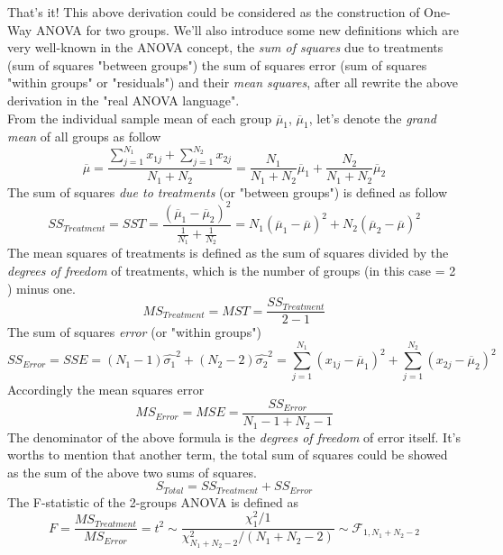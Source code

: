 That's it! This above derivation could be considered as the construction of One-Way ANOVA for two groups. We'll also introduce some new definitions which are very well-known in the ANOVA concept, the {\it sum of squares} due to treatments (sum of squares "between groups") the sum of squares error (sum of squares "within groups" or "residuals") and their {\it mean squares}, after all rewrite the above derivation in the "real ANOVA language".\\
From the individual sample mean of each group $\overline \mu_1$, $\overline \mu_1$, let's denote the {\it grand mean} of all groups as follow
\begin{equation*}
	\overline \mu 	= \frac	{ \sum^{N_1}_{j=1}{x_{1j}} + \sum^{N_2}_{j=1}{x_{2j}} }
							{N_1 + N_2} 
					= \frac{N_1}{N_1 + N_2}\overline \mu_1 + \frac{N_2}{N_1 + N_2}\overline \mu_2
\end{equation*}
The sum of squares {\it due to treatments} (or "between groups") is defined as follow
\begin{equation*}
	SS_{Treatment} 	= SST = \frac	{ (\overline \mu_1 - \overline \mu_2)^2 }
							{ \frac{1}{N_1} + \frac{1}{N_2} } 
					= N_1(\overline \mu_1 - \overline \mu)^2 + N_2(\overline \mu_2 - \overline \mu)^2
\end{equation*}
The mean squares of treatments is defined as the sum of squares divided by the {\it degrees of freedom} of treatments, which is the number of groups (in this case = 2 ) minus one.
\begin{equation*}
	MS_{Treatment} 	= MST = \frac	{ SS_{Treatment} }{ 2 - 1 }
\end{equation*}
The sum of squares {\it error} (or "within groups")
\begin{equation*}
	SS_{Error} = SSE	= (N_1 - 1)\hat{\sigma_1}^2 + (N_2 - 2)\hat{\sigma_2}^2
						= \sum^{N_1}_{j=1}{(x_{1j}-\overline \mu_1)^2} 
						+ \sum^{N_2}_{j=1}{(x_{2j}-\overline \mu_2)^2}
\end{equation*}
Accordingly the mean squares error
\begin{equation*}
	MS_{Error} 	= MSE 	= \frac	{ SS_{Error} }{ N_1 - 1 + N_2 - 1 }
\end{equation*}
The denominator of the above formula is the {\it degrees of freedom} of error itself.
It's worths to mention that another term, the total sum of squares could be showed as the sum of the above two sums of squares.
\begin{equation*}
	S_{Total} 	= SS_{Treatment} + SS_{Error}
\end{equation*}
The F-statistic of the 2-groups ANOVA is defined as
\begin{equation*}
	F = \frac{MS_{Treatment}}{MS_{Error}} = t^2 \sim \frac{\chi^2_1/1}{\chi^2_{N_1+N_2-2}/(N_1+N_2-2)} \sim \mathcal {F}_{1, N_1+N_2-2}
\end{equation*}
